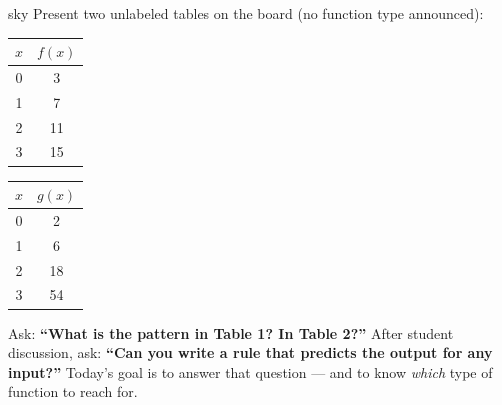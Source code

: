 \documentclass[10pt]{article}
\begin{document}
\begin{skillbox}[Hook]{sky}
Present two unlabeled tables on the board (no function type announced):

\medskip
\begin{center}
\renewcommand{\arraystretch}{1.4}
\begin{tabular}{c|c}
$x$ & $f(x)$ \\ \hline
0 & 3 \\ 1 & 7 \\ 2 & 11 \\ 3 & 15
\end{tabular}
\qquad\qquad
\begin{tabular}{c|c}
$x$ & $g(x)$ \\ \hline
0 & 2 \\ 1 & 6 \\ 2 & 18 \\ 3 & 54
\end{tabular}
\end{center}

\medskip
Ask: \textbf{``What is the pattern in Table 1? In Table 2?''} After student discussion, ask:
\textbf{``Can you write a rule that predicts the output for any input?''} Today's goal is to
answer that question — and to know \textit{which} type of function to reach for.
\end{skillbox}
\end{document}
